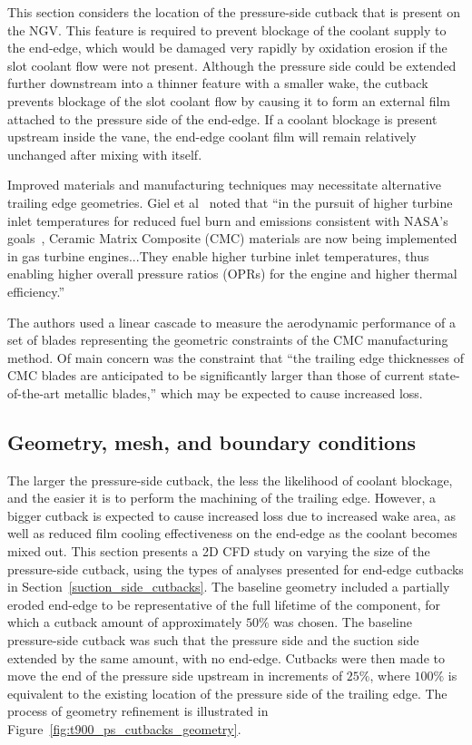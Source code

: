 \documentclass[a4paper, 11pt, oneside]{report}
\begin{document}
This section considers the location of the pressure-side cutback that is present on the NGV. This feature is required to prevent blockage of the coolant supply to the end-edge, which would be damaged very rapidly by oxidation erosion if the slot coolant flow were not present. Although the pressure side could be extended further downstream into a thinner feature with a smaller wake, the cutback prevents blockage of the slot coolant flow by causing it to form an external film attached to the pressure side of the end-edge. If a coolant blockage is present upstream inside the vane, the end-edge coolant film will remain relatively unchanged after mixing with itself.

Improved materials and manufacturing techniques may necessitate alternative trailing edge geometries. Giel et al~\cite{giel_te_thickness} noted that ``in the pursuit of higher turbine inlet temperatures for reduced fuel burn and emissions consistent with NASA's goals~\cite{giel_nasa_reference}, Ceramic Matrix Composite (CMC) materials are now being implemented in gas turbine engines...They enable higher turbine inlet temperatures, thus enabling higher overall pressure ratios (OPRs) for the engine and higher thermal efficiency.'' 

The authors used a linear cascade to measure the aerodynamic performance of a set of blades representing the geometric constraints of the CMC manufacturing method. Of main concern was the constraint that ``the trailing edge thicknesses of CMC blades are anticipated to be significantly larger than those of current state-of-the-art metallic blades,'' which may be expected to cause increased loss.

\subsection{Geometry, mesh, and boundary conditions}

The larger the pressure-side cutback, the less the likelihood of coolant blockage, and the easier it is to perform the machining of the trailing edge. However, a bigger cutback is expected to cause increased loss due to increased wake area, as well as reduced film cooling effectiveness on the end-edge as the coolant becomes mixed out. This section presents a 2D CFD study on varying the size of the pressure-side cutback, using the types of analyses presented for end-edge cutbacks in Section~\ref{suction_side_cutbacks}. The baseline geometry included a partially eroded end-edge to be representative of the full lifetime of the component, for which a cutback amount of approximately $50\%$ was chosen. The baseline pressure-side cutback was such that the pressure side and the suction side extended by the same amount, with no end-edge. Cutbacks were then made to move the end of the pressure side upstream in increments of $25\%$, where $100\%$ is equivalent to the existing location of the pressure side of the trailing edge. The process of geometry refinement is illustrated in Figure~\ref{fig:t900_ps_cutbacks_geometry}.
\end{document}
